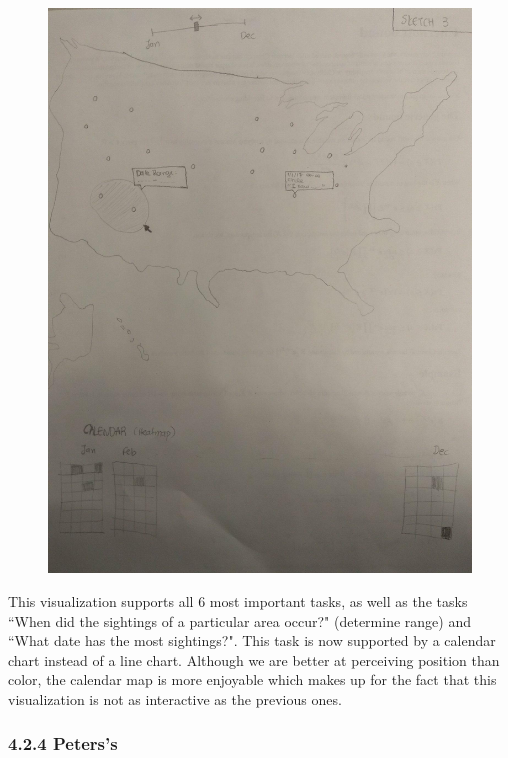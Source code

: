 \documentclass{neu_handout}
\begin{document}
\begin{figure}[h]
\centering
{
\includegraphics[width=0.7\linewidth]{lydia3}
}
\end{figure}

This visualization supports all 6 most important tasks, as well as the tasks ``When did the sightings of a particular area occur?" (determine range) and ``What date has the most sightings?". This task is now supported by a calendar chart instead of a line chart. Although we are better at perceiving position than color, the calendar map is more enjoyable which makes up for the fact that this visualization is not as interactive as the previous ones.

\newpage

\subsubsection*{4.2.4 Peters's}
\end{document}
